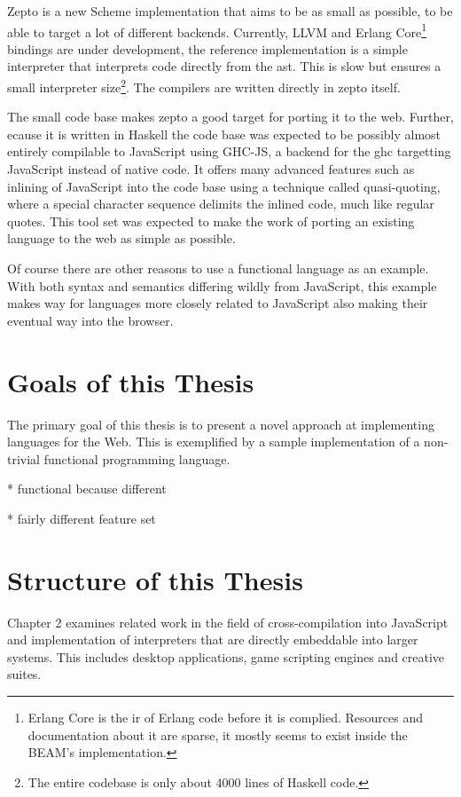 \documentclass[oneside,11pt,xetex]{scrbook}
\begin{document}
Zepto is a new Scheme implementation that aims to be as small as possible, to be able
to target a lot of different backends. Currently, LLVM and Erlang Core\footnote{Erlang Core 
is the \gls{ir} of Erlang code before it is complied. Resources and documentation
about it are sparse, it mostly seems to exist inside the BEAM's implementation.} bindings are
under development, the reference implementation is a simple interpreter that interprets code
directly from the \gls{ast}. This is slow but ensures a small interpreter size\footnote{The
entire codebase is only about 4000 lines of Haskell code.}. The compilers are written directly
in zepto itself.

The small code base makes zepto a good target for porting it to the web. Further, ecause it
is written in Haskell the code base was expected to be possibly almost entirely compilable
to JavaScript using GHC-JS, a backend for the \gls{ghc} targetting JavaScript instead of
native code. It offers many advanced features such as inlining of JavaScript into the code
base using a technique called quasi-quoting, where a special character sequence delimits the
inlined code, much like regular quotes. This tool set was expected to make the work of porting
an existing language to the web as simple as possible.

Of course there are other reasons to use a functional language as an example. With both syntax
and semantics differing wildly from JavaScript, this example makes way for languages more
closely related to JavaScript also making their eventual way into the browser.

\section{Goals of this Thesis}

The primary goal of this thesis is to present a novel approach at implementing languages
for the Web. This is exemplified by a sample implementation of a non-trivial functional programming
language.

* functional because different

* fairly different feature set

\section{Structure of this Thesis}

Chapter 2 examines related work in the field of cross-compilation into JavaScript and implementation
of interpreters that are directly embeddable into larger systems. This includes desktop applications,
game scripting engines and creative suites.
\end{document}
